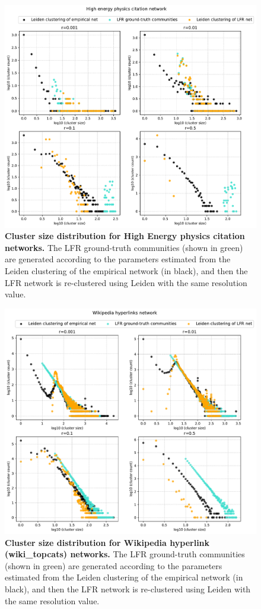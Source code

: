 \documentclass[a4paper]{article}   	%
\begin{document}
\begin{figure}[H]
\centering
\includegraphics[width=0.85\linewidth]{figs/cit_hepph_cm_size.pdf}
\caption[Cluster size distribution for High Energy physics citation networks.]{\textbf{Cluster size distribution for High Energy physics citation networks.} The LFR ground-truth communities (shown in green) are generated according to the parameters estimated from the Leiden clustering of the empirical network (in black), and then the LFR network is re-clustered using Leiden with the same resolution value. }
\label{fig:cit_hepph_cm_size}
\end{figure}


\begin{figure}[H]
\centering
\includegraphics[width=0.85\linewidth]{figs/wiki_topcats_cm_size.pdf}
\caption[Cluster size distribution for Wikipedia hyperlink networks.]{\textbf{Cluster size distribution for Wikipedia hyperlink (wiki\_topcats) networks.} The LFR ground-truth communities (shown in green) are generated according to the parameters estimated from the Leiden clustering of the empirical network (in black), and then the LFR network is re-clustered using Leiden with the same resolution value. }
\label{fig:wiki_topcats_cm_size}
\end{figure}
\end{document}
